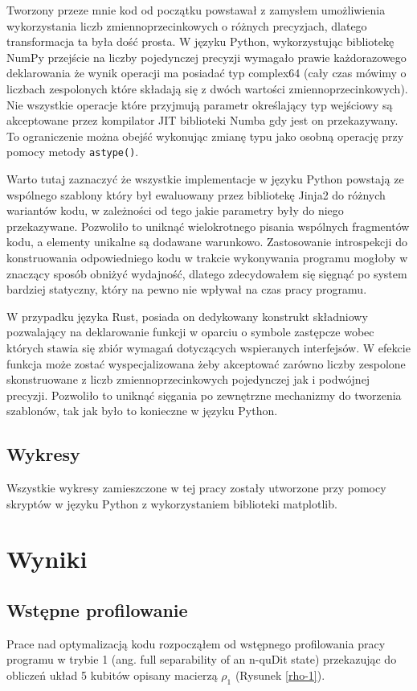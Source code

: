 \documentclass[11pt, a4paper]{article}
\newcommand{\code}[1]{\texttt{#1}}
\begin{document}
\begin{sloppypar}
    Tworzony przeze mnie kod od początku powstawał z zamysłem umożliwienia wykorzystania
    liczb zmiennoprzecinkowych o różnych precyzjach, dlatego transformacja ta była dość prosta.
    W języku Python, wykorzystując bibliotekę NumPy przejście na liczby pojedynczej precyzji
    wymagało prawie każdorazowego deklarowania że wynik operacji ma posiadać typ complex64
    (cały czas mówimy o liczbach zespolonych które składają się z dwóch wartości
    zmiennoprzecinkowych). Nie wszystkie operacje które przyjmują parametr określający
    typ wejściowy są akceptowane przez kompilator JIT biblioteki Numba gdy jest on
    przekazywany. To ograniczenie można obejść wykonując zmianę typu jako osobną operację
    przy pomocy metody \code{astype()}.

    Warto tutaj zaznaczyć że wszystkie implementacje w języku Python powstają ze
    wspólnego szablony który był ewaluowany przez bibliotekę Jinja2 do różnych wariantów
    kodu, w zależności od tego jakie parametry były do niego przekazywane. Pozwoliło to
    uniknąć wielokrotnego pisania wspólnych fragmentów kodu, a elementy unikalne są dodawane
    warunkowo. Zastosowanie introspekcji do konstruowania odpowiedniego kodu w trakcie
    wykonywania programu mogłoby w znaczący sposób obniżyć wydajność, dlatego zdecydowałem
    się sięgnąć po system bardziej statyczny, który na pewno nie wpływał na czas pracy
    programu.

    W przypadku języka Rust, posiada on dedykowany konstrukt składniowy pozwalający na deklarowanie
    funkcji w oparciu o symbole zastępcze wobec których stawia się zbiór wymagań dotyczących
    wspieranych interfejsów. W efekcie funkcja może zostać wyspecjalizowana żeby
    akceptować zarówno liczby zespolone skonstruowane z liczb zmiennoprzecinkowych
    pojedynczej jak i podwójnej precyzji. Pozwoliło to uniknąć sięgania po zewnętrzne mechanizmy
    do tworzenia szablonów, tak jak było to konieczne w języku Python.

    \subsection{Wykresy}
    Wszystkie wykresy zamieszczone w tej pracy zostały utworzone przy pomocy skryptów w
    języku Python z wykorzystaniem biblioteki matplotlib\cite{Hunter:2007}.

    \section{Wyniki}
    \subsection{Wstępne profilowanie}
    Prace nad optymalizacją kodu rozpocząłem od wstępnego profilowania pracy programu w trybie
    1 (ang. full separability of an n-quDit state) przekazując do obliczeń układ 5
    kubitów opisany macierzą $\rho_{1}$ (Rysunek \ref{rho-1}).


\end{sloppypar}
\end{document}
